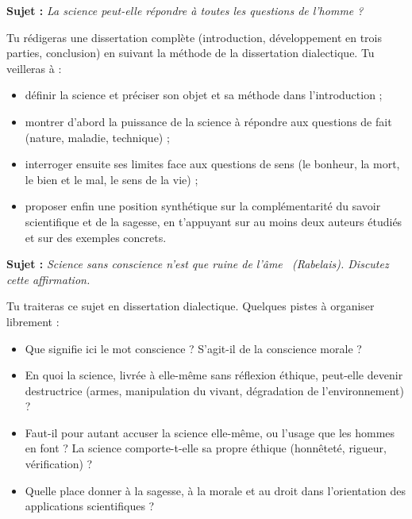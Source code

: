 \documentclass[11pt]{article}
\newcommand{\cle}[1]{{\popxbold\color{popdark}#1}}
\begin{document}
\begin{exercice}
\textbf{Sujet :} \emph{La science peut-elle répondre à toutes les questions de l'homme ?}

Tu rédigeras une dissertation complète (introduction, développement en trois parties, conclusion) en suivant la méthode de la dissertation dialectique. Tu veilleras à :
\begin{itemize}
\item définir la science et préciser son objet et sa méthode dans l'introduction ;
\item montrer d'abord la puissance de la science à répondre aux questions de fait (nature, maladie, technique) ;
\item interroger ensuite ses limites face aux questions de sens (le bonheur, la mort, le bien et le mal, le sens de la vie) ;
\item proposer enfin une position synthétique sur la complémentarité du savoir scientifique et de la sagesse, en t'appuyant sur au moins deux auteurs étudiés et sur des exemples concrets.
\end{itemize}
\end{exercice}

\begin{exercice}
\textbf{Sujet :} \emph{\guillemotleft Science sans conscience n'est que ruine de l'âme \guillemotright\ (Rabelais). Discutez cette affirmation.}

Tu traiteras ce sujet en dissertation dialectique. Quelques pistes à organiser librement :
\begin{itemize}
\item Que signifie ici le mot \cle{conscience} ? S'agit-il de la conscience morale ?
\item En quoi la science, livrée à elle-même sans réflexion éthique, peut-elle devenir destructrice (armes, manipulation du vivant, dégradation de l'environnement) ?
\item Faut-il pour autant accuser la science elle-même, ou l'usage que les hommes en font ? La science comporte-t-elle sa propre éthique (honnêteté, rigueur, vérification) ?
\item Quelle place donner à la sagesse, à la morale et au droit dans l'orientation des applications scientifiques ?
\end{itemize}
\end{exercice}
\end{document}
